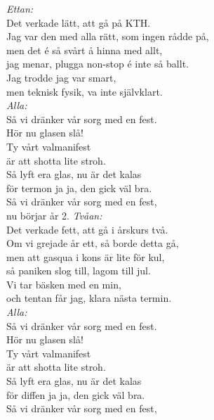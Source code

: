 \documentclass[a6paper,10pt]{article}
\begin{document}
\begin{center}
\end{center}
\begin{lyrics}
\textit{Ettan:} \\
Det verkade lätt, att gå på KTH. \\
Jag var den med alla rätt, som ingen rådde på, \\
men det é så svårt å hinna med allt, \\
jag menar, plugga non-stop é inte så ballt. \\
Jag trodde jag var smart, \\
men teknisk fysik, va inte självklart.
\vspace{5pt} \\
\textit{Alla:} \\
Så vi dränker vår sorg med en fest. \\
Hör nu glasen slå! \\
Ty vårt valmanifest \\
är att shotta lite stroh. \\
Så lyft era glas, nu är det kalas \\
för termon ja ja, den gick väl bra. \\
Så vi dränker vår sorg med en fest, \\
nu börjar år 2.
\newpage
\setlength{\oddsidemargin}{-0.47in}
\noindent
\textit{Tvåan:} \\
Det verkade fett, att gå i årskurs två. \\
Om vi grejade år ett, så borde detta gå, \\
men att gasqua i kons är lite för kul, \\
så paniken slog till, lagom till jul. \\
Vi tar bäsken med en min, \\
och tentan får jag, klara nästa termin.
\vspace{5pt} \\
\textit{Alla:} \\
Så vi dränker vår sorg med en fest. \\
Hör nu glasen slå! \\
Ty vårt valmanifest \\
är att shotta lite stroh. \\
Så lyft era glas, nu är det kalas \\
för diffen ja ja, den gick väl bra. \\
Så vi dränker vår sorg med en fest, \\

\end{lyrics}
\end{document}
